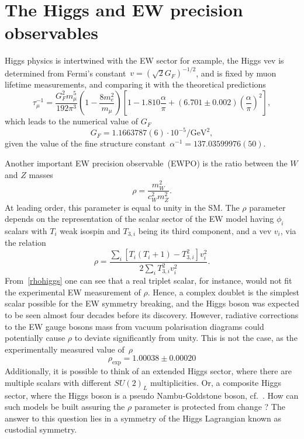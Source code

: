 \section{The Higgs and EW precision observables}
\par Higgs physics is intertwined with the EW sector for example, the Higgs vev is determined from Fermi's constant~$v =(\sqrt{2}G_F)^{-1/2}$, and is fixed by muon lifetime measurements, and comparing it with the theoretical predictions~\cite{PhysRev.101.866,PhysRev.113.1652,Mohammad:1976qd,PhysRevLett.82.488} 
\begin{equation}
    \tau_\mu^{-1} = \frac{G_F^2 m_\mu^5}{192\pi^3}\left(1-\frac{8 m_e^2}{m_\mu}\right) \left[1-1.810\frac{\alpha}{\pi}+(6.701\pm0.002)\left(\frac{\alpha}{\pi}\right)^2\right],
\end{equation}
which leads to the numerical value of $G_F$~\cite{Zyla:2020zbs}
\begin{equation}
    G_F=1.1663787(6) \cdot 10^{-5} \si{\per\GeV\squared},
\end{equation}
given the value of the fine structure constant~$\alpha^{-1} =137.03599976 (50)$. 
\par Another important EW precision observable~(EWPO) is the ratio between the $W$ and $Z$ masses
\begin{equation}
    \rho = \frac{m_W^2}{c_W^2m_Z^2}.
\end{equation}
At leading order, this parameter is equal to unity in the SM. The $\rho$ parameter depends on the representation of the scalar sector of the EW model having $\phi_i$ scalars with $T_i$ weak isospin and $T_{3,i}$ being its third component, and a vev $v_i$, via the relation~\cite{ROSS1975135,Djouadi:2005gi}
\begin{equation}
    \rho =\frac{\sum_i [T_{i}(T_{i}+1)-T_{3,i}^2]v_i^2}{2\sum_i T_{3,i}^2v_i^2}.
    \label{rhohiggs}
\end{equation}
From~\eqref{rhohiggs} one can see that a real triplet scalar, for instance, would not fit the experimental EW measurement of $\rho$. Hence, a complex doublet is the simplest scalar possible for the EW symmetry breaking, and the Higgs boson was expected to be seen almost four decades before its discovery. However, radiative corrections to the EW gauge bosons mass from vacuum polarisation diagrams could potentially cause $\rho$ to deviate significantly from unity.  This is not the case, as the experimentally measured value of~$\rho$~\cite{Zyla:2020zbs}
\begin{equation}
    \rho_{\text{exp}} = 1.00038 \pm 0.00020
    \label{eq:rhoexp}
\end{equation}
Additionally, it is possible to think of an extended Higgs sector, where there are multiple scalars with different $SU(2)_L$ multiplicities. Or, a composite Higgs sector, where the Higgs boson is a pseudo Nambu-Goldstone boson, cf.~\cite{Dugan1985AnatomyOA,Hill:2002ap}. How can such models be built assuring the $\rho$ parameter is protected from change ? The answer to this question lies in a symmetry of the Higgs Lagrangian known as custodial symmetry. 
